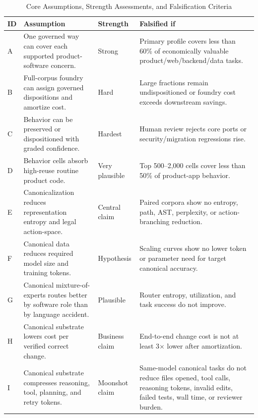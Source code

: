 \begin{table}[t]
\caption{Core Assumptions, Strength Assessments, and Falsification Criteria}
\label{tab:assumptions}
\centering
\footnotesize
\begin{tabularx}{\textwidth}{p{}p{}p{}X}
\toprule
ID & Assumption & Strength & Falsified if \\
\midrule
A & One governed way can cover each supported product-software concern. & Strong & Primary profile covers less than 60\% of economically valuable product/web/backend/data tasks. \\
B & Full-corpus foundry can assign governed dispositions and amortize cost. & Hard & Large fractions remain undispositioned or foundry cost exceeds downstream savings. \\
C & Behavior can be preserved or dispositioned with graded confidence. & Hardest & Human review rejects core ports or security/migration regressions rise. \\
D & Behavior cells absorb high-reuse routine product code. & Very plausible & Top 500--2,000 cells cover less than 50\% of product-app behavior. \\
E & Canonicalization reduces representation entropy and legal action-space. & Central claim & Paired corpora show no entropy, path, AST, perplexity, or action-branching reduction. \\
F & Canonical data reduces required model size and training tokens. & Hypothesis & Scaling curves show no lower token or parameter need for target canonical accuracy. \\
G & Canonical mixture-of-experts routes better by software role than by language accident. & Plausible & Router entropy, utilization, and task success do not improve. \\
H & Canonical substrate lowers cost per verified correct change. & Business claim & End-to-end change cost is not at least 3$\times$ lower after amortization. \\
I & Canonical substrate compresses reasoning, tool, planning, and retry tokens. & Moonshot claim & Same-model canonical tasks do not reduce files opened, tool calls, reasoning tokens, invalid edits, failed tests, wall time, or reviewer burden. \\
\bottomrule
\end{tabularx}
\end{table}

